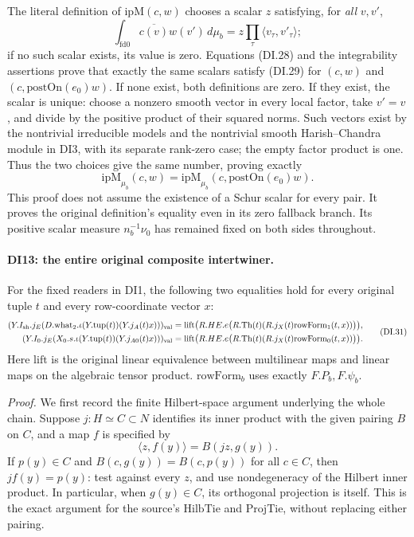 The literal definition of \(\mathrm{ipM}(c,w)\) chooses a scalar
\(z\) satisfying, for \emph{all} \(v,v'\),
\[
 \int_{\mathrm{fd0}}\overline{c(v)}w(v')\,d\mu_b
          =z\prod_\tau\langle v_\tau,v'_\tau\rangle;
 \tag{DI.29}
\]
if no such scalar exists, its value is zero. Equations (DI.28) and
the integrability assertions prove that exactly the same scalars
satisfy (DI.29) for \((c,w)\) and \((c,\mathrm{postOn}(e_0)w)\).
If none exist, both definitions are zero. If they exist, the scalar
is unique: choose a nonzero smooth vector in every local factor,
take \(v'=v\), and divide by the positive product of their squared
norms. Such vectors exist by the nontrivial irreducible models and
the nontrivial smooth Harish--Chandra module in DI3, with its
separate rank-zero case; the empty factor product is one.
Thus the two choices give the same number, proving exactly
\[
 \mathrm{ipM}_{\mu_b}(c,w)
       =\mathrm{ipM}_{\mu_b}(c,\mathrm{postOn}(e_0)w).
 \tag{DI.30}
\]
This proof does not assume the existence of a Schur scalar for every
pair. It proves the original definition's equality even in its
zero fallback branch. Its positive scalar measure \(n_b^{-1}\nu_0\)
has remained fixed on both sides throughout.

\paragraph{DI13: the entire original composite intertwiner.}
\label{claim:DI13}
For the fixed readers in DI1, the following two equalities hold for
every original tuple \(t\) and every row-coordinate vector \(x\):
\[
\begin{split}
 (Y.I_{\rm sh}.j_E(D.\mathrm{what}_2.\iota(Y.\mathrm{tup}(t))
                                      (Y.j_A(t)x)))_{\rm val}
 &=\mathrm{lift}\bigl(R.HE.e\bigl(R.\mathrm{Th}(t)
                  (R.j_X(t)\mathrm{rowForm}_1(t,x))\bigr)\bigr),\\
 (Y.I_0.j_E(X_0.s.\iota(Y.\mathrm{tup}(t))
                                      (Y.j_{A0}(t)x)))_{\rm val}
 &=\mathrm{lift}\bigl(R.HE.e\bigl(R.\mathrm{Th}(t)
                  (R.j_X(t)\mathrm{rowForm}_0(t,x))\bigr)\bigr).
\end{split}
 \tag{DI.31}
\]
Here \(\mathrm{lift}\) is the original linear equivalence between
multilinear maps and linear maps on the algebraic tensor product.
\(\mathrm{rowForm}_b\) uses exactly \(F.P_b,F.\psi_b\).

\emph{Proof.}
We first record the finite Hilbert-space argument underlying the
whole chain. Suppose \(j:H\simeq C\subset N\) identifies its
inner product with the given pairing \(B\) on \(C\), and a map
\(f\) is specified by
\[
             \langle z,f(y)\rangle=B(jz,g(y)).
\]
If \(p(y)\in C\) and \(B(c,g(y))=B(c,p(y))\) for all \(c\in C\),
then \(jf(y)=p(y)\): test against every \(z\), and use
nondegeneracy of the Hilbert inner product. In particular, when
\(g(y)\in C\), its orthogonal projection is itself. This is the
exact argument for the source's \(\mathrm{HilbTie}\) and
\(\mathrm{ProjTie}\), without replacing either pairing.

